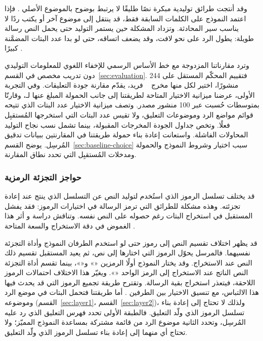 وقد أنتجت طرائق توليدية مبكرة نصًا طليقًا لا يرتبط بوضوح بالموضوع الأصلي \cite{ding2023context}. فإذا اعتمد النموذج على الكلمات السابقة فقط، قد ينتقل إلى موضوع آخر أو يكتب ردًا لا يناسب سير المحادثة. وتزداد المشكلة حين يستمر التوليد حتى يحمل النص رسالة طويلة: يطول الرد على نحو لافت، وقد يضعف اتساقه، حتى لو بدا عدد البتات المضمَّنة كبيرًا \cite{li2024semantic,xiang2023cpg,steinebach2024natural,xu2024beyond}.

وترد مقارناتنا المزدوجة مع خط الأساس الرسمي للإخفاء اللغوي للمعلومات التوليدي دون تدريب مخصص \cite{lin2024zero} في القسم~\ref{sec:evaluation}.
فتقييم المحكّم المستقل على 244 منشورًا، اختير لكل منها مخرج ~\cite{lin2024zero} فريد، يقدّم مقارنة جودة التعليقات.
وفي التجربة الأولى، عرضنا ميزانية الاختيار المتاحة لطريقتنا إلى جانب الحمولة المبلغ عنها لـ، وقارنّا  بمتوسطات حُسبت عبر 100 منشور مصدر. وتصف ميزانية الاختيار عدد البتات الذي تتيحه قوائم مواضع الرد وموضوعات التعليق، ولا تقيس عدد البتات التي استخرجها المُستقبِل فعلًا. وتخص جداول الجودة المخرجات المقبولة، بينما تشمل نسب نجاح التوليد المحاولات الفاشلة. واستعانت إعادة بناء حمولة طريقتنا في المقارنتين ببيانات تدقيق المُرسِل. يوضح القسم~\ref{sec:baseline-choice} سبب اختيار  وشروط النموذج والحمولة ومدخلات المُستقبِل التي تحدد نطاق المقارنة.

\subsubsection{حواجز التجزئة الرمزية}

قد يختلف تسلسل الرموز الذي استُخدم لتوليد النص عن التسلسل الذي ينتج عند إعادة تجزئته. وهذه مشكلة للطرائق التي ترمز الرسالة في اختيارات الرموز: فقد يفشل المستقبل في استخراج البتات رغم حصوله على النص نفسه. وتناقش دراسة  و أثر هذا الغموض في دقة الاستخراج والسعة المتاحة \cite{qi2024provably}.

قد يظهر اختلاف تقسيم النص إلى رموز حتى لو استخدم الطرفان النموذج وأداة التجزئة نفسيهما. فالمرسل يحوّل الرموز التي اختارها إلى نص، ثم يعيد المستقبل تقسيم ذلك النص عند الاستخراج. وقد يختار النموذج أولًا الرمزين «» و«»، بينما تقسم أداة التجزئة النص الناتج عند الاستخراج إلى الرمز الواحد «». ويغيّر هذا الاختلاف احتمالات الرموز اللاحقة، فيتعذر استخراج بقية الرسالة. وتقترح طريقة  تجميع الرموز التي قد يحدث فيها هذا الالتباس، مع تنسيق الاختيار بين الطرفين \cite{qi2024provably}. أما طريقتنا فتحمل البتات في موضع الرد وموضوعه (القسم~\ref{sec:layer1}، القسم~\ref{sec:layer2})، ولذلك لا تحتاج إلى إعادة بناء تسلسل الرموز الذي ولّد التعليق.
فالطبقة الأولى تحدد فهرس التعليق الذي رد عليه المُرسِل، وتحدد الثانية موضوع الرد من قائمة مشتركة بمساعدة النموذج المميّز؛ ولا تحتاج أي منهما إلى إعادة بناء تسلسل الرموز الذي ولّد التعليق.

